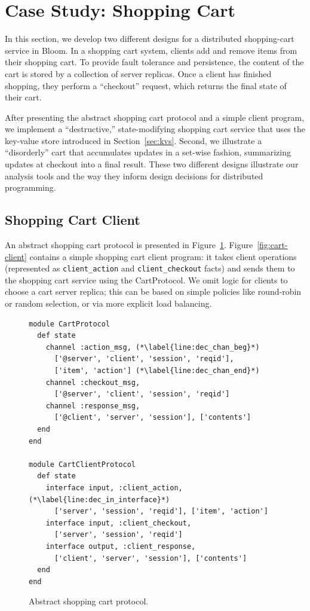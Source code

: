 \section{Case Study: Shopping Cart}
\label{sec:case}
In this section, we develop two different designs for a distributed
shopping-cart service in Bloom. In a
shopping cart system, clients add and remove items from their shopping cart. To
provide fault tolerance and persistence, the content of the cart is stored by a
collection of server replicas. Once a client has finished shopping, they perform
a ``checkout'' request, which returns the final state of their cart.

After presenting the abstract shopping cart protocol and a simple client
program, we implement a ``destructive,'' state-modifying shopping cart service
that uses the key-value store introduced in Section~\ref{sec:kvs}. Second, we
illustrate a ``disorderly'' cart that accumulates updates in a set-wise fashion,
summarizing updates at checkout into a final result.  These two different
designs illustrate our analysis tools and the way they inform design decisions
for distributed programming.

\subsection{Shopping Cart Client}
An abstract shopping cart protocol is presented in
Figure~\ref{fig:cart-protocol}. Figure~\ref{fig:cart-client} contains a simple
shopping cart client program: it takes client operations (represented as
\texttt{client\_action} and \texttt{client\_checkout} facts) and sends them to
the shopping cart service using the CartProtocol. We omit logic for clients to choose a cart server replica; this can be based on simple policies like round-robin or random selection, or via more explicit load balancing.

\begin{figure}[t]
\begin{scriptsize}
\begin{lstlisting}
module CartProtocol
  def state
    channel :action_msg, (*\label{line:dec_chan_beg}*)
      ['@server', 'client', 'session', 'reqid'],
      ['item', 'action'] (*\label{line:dec_chan_end}*)
    channel :checkout_msg,
      ['@server', 'client', 'session', 'reqid']
    channel :response_msg,
      ['@client', 'server', 'session'], ['contents']
  end
end

module CartClientProtocol
  def state
    interface input, :client_action, (*\label{line:dec_in_interface}*)
      ['server', 'session', 'reqid'], ['item', 'action'] 
    interface input, :client_checkout,
      ['server', 'session', 'reqid']
    interface output, :client_response, 
      ['client', 'server', 'session'], ['contents']
  end
end
\end{lstlisting}
\vspace{-10pt}
\caption{Abstract shopping cart protocol.}
\label{fig:cart-protocol}
\end{scriptsize}
\vspace{-2pt}
\end{figure}

